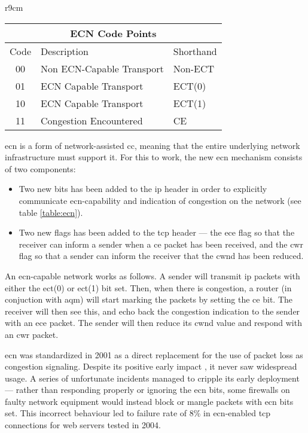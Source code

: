 \begin{wraptable}{r}{9cm}
    \begin{tabular}{|c|l|l|}
        \multicolumn{3}{c}{ECN Code Points} \\
        \hline
        Code & Description & Shorthand \\
        \hline
        00 & Non ECN-Capable Transport & Non-ECT \\
        \hline
        01 & ECN Capable Transport & ECT(0) \\
        \hline
        10 & ECN Capable Transport & ECT(1) \\
        \hline
        11 & Congestion Encountered & CE \\
        \hline
    \end{tabular}
    \caption{The four different code points for \gls{ecn} that is encoded in the \gls{ip} header.}
    \label{table:ecn}
\end{wraptable}

\gls{ecn} is a form of network-assisted \gls{cc}, meaning that the entire underlying network infrastructure must support it. For this to work, the new \gls{ecn} mechanism consists of two components:

\begin{itemize}
    \item Two new bits has been added to the \gls{ip} header in order to explicitly communicate \gls{ecn}-capability and indication of congestion on the network (see table \ref{table:ecn}).
    \item Two new flags has been added to the \gls{tcp} header --- the \gls{ece} flag so that the receiver can inform a sender when a \gls{ce} packet has been received, and the \gls{cwr} flag so that a sender can inform the receiver that the \gls{cwnd} has been reduced.
\end{itemize}

An \gls{ecn}-capable network works as follows. A sender will transmit \gls{ip} packets with either the \gls{ect}(0) or \gls{ect}(1) bit set. Then, when there is congestion, a router (in conjuction with \gls{aqm}) will start marking the packets by setting the \gls{ce} bit. The receiver will then see this, and echo back the congestion indication to the sender with an \gls{ece} packet. The sender will then reduce its \gls{cwnd} value and respond with an \gls{cwr} packet.

\gls{ecn} was standardized in 2001 as a direct replacement for the use of packet loss as congestion signaling. \cite{rfc3168} Despite its positive early impact \cite{rfc2884}, it never saw widespread usage. \cite{enabling_internet-wide_ecn} A series of unfortunate incidents managed to cripple its early deployment --- rather than responding properly or ignoring the \gls{ecn} bits, some firewalls on faulty network equipment would instead block or mangle packets with \gls{ecn} bits set. This incorrect behaviour led to failure rate of 8\% in \gls{ecn}-enabled \gls{tcp} connections for web servers tested in 2004. \cite{pre-congestion_notification}

